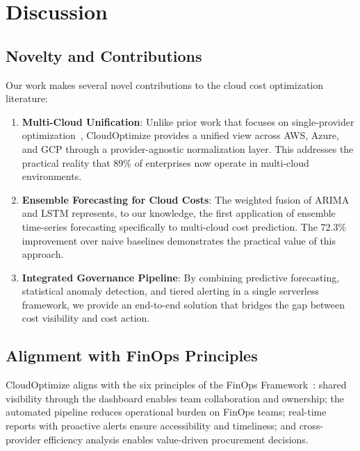\documentclass[conference]{IEEEtran}
\begin{document}
\section{Discussion}
\label{sec:discussion}

\subsection{Novelty and Contributions}

Our work makes several novel contributions to the cloud cost optimization literature:

\begin{enumerate}
    \item \textbf{Multi-Cloud Unification}: Unlike prior work that focuses on single-provider optimization~\cite{weyori2024,bhardwaj2023,richards2025}, CloudOptimize provides a unified view across AWS, Azure, and GCP through a provider-agnostic normalization layer. This addresses the practical reality that 89\% of enterprises now operate in multi-cloud environments.
    
    \item \textbf{Ensemble Forecasting for Cloud Costs}: The weighted fusion of ARIMA and LSTM represents, to our knowledge, the first application of ensemble time-series forecasting specifically to multi-cloud cost prediction. The 72.3\% improvement over naive baselines demonstrates the practical value of this approach.
    
    \item \textbf{Integrated Governance Pipeline}: By combining predictive forecasting, statistical anomaly detection, and tiered alerting in a single serverless framework, we provide an end-to-end solution that bridges the gap between cost visibility and cost action.
\end{enumerate}

\subsection{Alignment with FinOps Principles}

CloudOptimize aligns with the six principles of the FinOps Framework~\cite{finops2024}: shared visibility through the dashboard enables team collaboration and ownership; the automated pipeline reduces operational burden on FinOps teams; real-time reports with proactive alerts ensure accessibility and timeliness; and cross-provider efficiency analysis enables value-driven procurement decisions.
\end{document}
